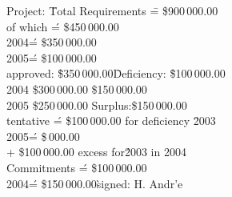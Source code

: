\documentclass{article}
\begin{document}
\begin{tabbing}
Project: \=Total Requirements \= = \$900\,000.00 \+\\
  of which \'= \$450\,000.00 \+\\
  2004\' = \$350\,000.00 \\ 2005\' = \$100\,000.00\-\\[0.5ex]  approved: \=\$350\,000.00\quad\= Deficiency: \= \$100\,000.00\\
  2004 \> \$300\,000.00 \>\>\$150\,000.00\\
  2005 \> \$250\,000.00 \> Surplus:\>\$150\,000.00 \\[0.5ex] \poptabs 
  tentative \' = \$1\=00\,000.00 for deficiency \= 2003 \+\\
        	 2005\' = \$\,000.00                  \\
		+ \$100\,000.00 \>\>excess for\'2003 in 2004\-\-\\[0.5ex]
  Commitments \>\'= \$100\,000.00\+\+\\
  2004\'= \$150\,000.00\` signed: H. Andr\a'e
\end{tabbing}
\end{document}
